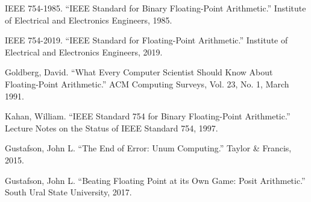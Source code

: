 \documentclass[12pt,letter]{article}
\begin{document}
\begin{thebibliography}{}

 IEEE 754-1985. ``IEEE Standard for Binary Floating-Point Arithmetic.'' Institute of Electrical and Electronics Engineers, 1985.

 IEEE 754-2019. ``IEEE Standard for Floating-Point Arithmetic.'' Institute of Electrical and Electronics Engineers, 2019.

 Goldberg, David. ``What Every Computer Scientist Should Know About Floating-Point Arithmetic.'' ACM Computing Surveys, Vol. 23, No. 1, March 1991.

 Kahan, William. ``IEEE Standard 754 for Binary Floating-Point Arithmetic.'' Lecture Notes on the Status of IEEE Standard 754, 1997.

 Gustafson, John L. ``The End of Error: Unum Computing.'' Taylor \& Francis, 2015.

 Gustafson, John L. ``Beating Floating Point at its Own Game: Posit Arithmetic.'' South Ural State University, 2017.

\end{thebibliography}
\end{document}
